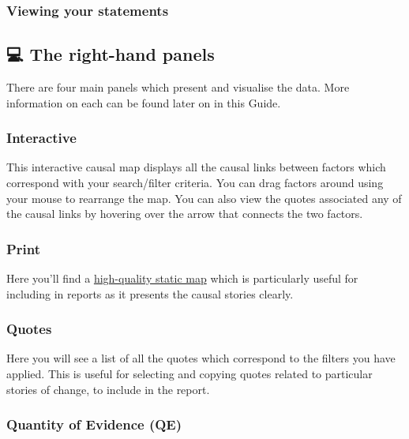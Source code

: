 \documentclass[
]{book}
\begin{document}
\hypertarget{viewing-your-statements-1}{%
\subsubsection{Viewing your statements}\label{viewing-your-statements-1}}

\hypertarget{the-right-hand-panels-1}{%
\subsection{💻 The right-hand panels}\label{the-right-hand-panels-1}}

There are four main panels which present and visualise the data. More information on each can be found later on in this Guide.

\hypertarget{interactive-1}{%
\subsubsection{Interactive}\label{interactive-1}}

This interactive causal map displays all the causal links between factors which correspond with your search/filter criteria. You can drag factors around using your mouse to rearrange the map. You can also view the quotes associated any of the causal links by hovering over the arrow that connects the two factors.

\hypertarget{print-1}{%
\subsubsection{Print}\label{print-1}}

Here you'll find a \protect\hyperlink{viewing-the-print-map}{high-quality static map} which is particularly useful for including in reports as it presents the causal stories clearly.

\hypertarget{quotes-1}{%
\subsubsection{Quotes}\label{quotes-1}}

Here you will see a list of all the quotes which correspond to the filters you have applied. This is useful for selecting and copying quotes related to particular stories of change, to include in the report.

\hypertarget{quantity-of-evidence-qe-1}{%
\subsubsection{Quantity of Evidence (QE)}\label{quantity-of-evidence-qe-1}}
\end{document}
